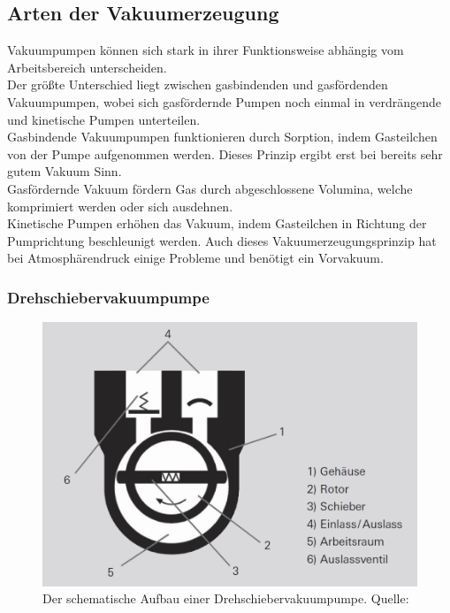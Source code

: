 	\subsection{Arten der Vakuumerzeugung}	
		
		\noindent
		Vakuumpumpen können sich stark in ihrer Funktionsweise abhängig vom Arbeitsbereich unterscheiden.\\	
		Der größte Unterschied liegt zwischen gasbindenden und gasfördenden Vakuumpumpen, wobei sich gasfördernde Pumpen noch einmal in verdrängende und kinetische Pumpen unterteilen.\\
		Gasbindende Vakuumpumpen funktionieren durch Sorption, indem Gasteilchen von der Pumpe aufgenommen werden. 
		Dieses Prinzip ergibt erst bei bereits sehr gutem Vakuum Sinn.  \\
		Gasfördernde Vakuum fördern Gas durch abgeschlossene Volumina, welche komprimiert werden oder sich ausdehnen.\\
		Kinetische Pumpen erhöhen das Vakuum, indem Gasteilchen in Richtung der Pumprichtung beschleunigt werden.
		Auch dieses Vakuumerzeugungsprinzip hat bei Atmosphärendruck einige Probleme und benötigt ein Vorvakuum.

		\subsubsection{Drehschiebervakuumpumpe} 
						
			\begin{figure}
				\centering
				\includegraphics[width=0.5\linewidth]{"latex/images/Drehschieber.png"}
				\caption{Der schematische Aufbau einer Drehschiebervakuumpumpe. \protect Quelle: \cite{pfeiffer:pump}}
				\label{fig:dreh}
			\end{figure}  

